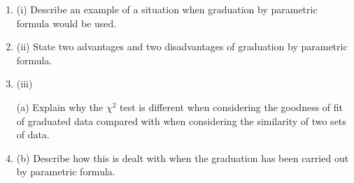 \documentclass[a4paper,12pt]{article}
\begin{document}
\begin{enumerate}

\item (i) Describe an example of a situation when graduation by parametric formula
would be used.

\item (ii) State two advantages and two disadvantages of graduation by parametric
formula.
\item (iii)

(a) Explain why the $\chi^2$ test is different when considering the goodness of fit of graduated data compared with when considering the similarity of two sets of data.
\item (b) Describe how this is dealt with when the graduation has been carried
out by parametric formula.
\end{enumerate}
\newpage
\end{document}
